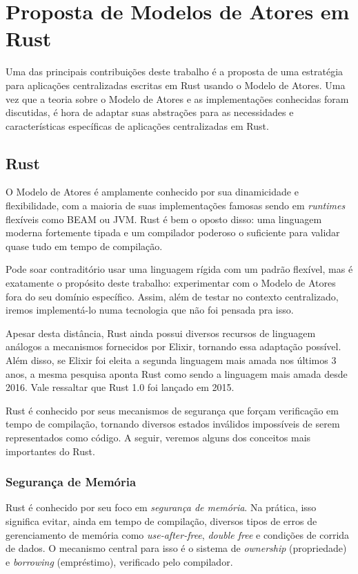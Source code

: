 \chapter{Proposta de Modelos de Atores em Rust}

Uma das principais contribuições deste trabalho é a proposta de uma estratégia para aplicações centralizadas escritas em Rust usando o Modelo de Atores. Uma vez que a teoria sobre o Modelo de Atores e as implementações conhecidas foram discutidas, é hora de adaptar suas abstrações para as necessidades e características específicas de aplicações centralizadas em Rust.

\section{Rust}

O Modelo de Atores é amplamente conhecido por sua dinamicidade e flexibilidade, com a maioria de suas implementações famosas sendo em \emph{runtimes} flexíveis como BEAM ou JVM. Rust \citep{rust_lang} é bem o oposto disso: uma linguagem moderna fortemente tipada e um compilador poderoso o suficiente para validar quase tudo em tempo de compilação.

Pode soar contraditório usar uma linguagem rígida com um padrão flexível, mas é exatamente o propósito deste trabalho: experimentar com o Modelo de Atores fora do seu domínio específico. Assim, além de testar no contexto centralizado, iremos implementá-lo numa tecnologia que não foi pensada pra isso.

Apesar desta distância, Rust ainda possui diversos recursos de linguagem análogos a mecanismos fornecidos por Elixir, tornando essa adaptação possível. Além disso, se Elixir foi eleita a segunda linguagem mais amada nos últimos 3 anos, a mesma pesquisa aponta Rust como sendo a linguagem mais amada desde 2016. Vale ressaltar que Rust 1.0 foi lançado em 2015.

Rust é conhecido por seus mecanismos de segurança que forçam verificação em tempo de compilação, tornando diversos estados inválidos impossíveis de serem representados como código. A seguir, veremos alguns dos conceitos mais importantes do Rust.

\subsection{Segurança de Memória}

Rust é conhecido por seu foco em \emph{segurança de memória}. Na prática, isso significa evitar, ainda em tempo de compilação, diversos tipos de erros de gerenciamento de memória como \emph{use-after-free}, \emph{double free} e condições de corrida de dados. O mecanismo central para isso é o sistema de \emph{ownership} (propriedade) e \emph{borrowing} (empréstimo), verificado pelo compilador.

